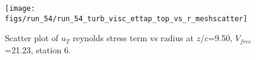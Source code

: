 \begin{figure}[H]
\centering
\texttt{[image: figs/run\_54/run\_54\_turb\_visc\_ettap\_top\_vs\_r\_meshscatter]}
\caption{Scatter plot of $
u_T$ reynolds stress term vs radius at $z/c$=9.50, $V_{free}$=21.23, station 6.}
\end{figure}


